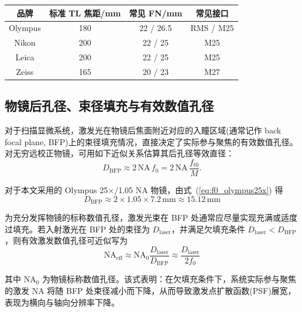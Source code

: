 \begin{table}[htbp]
\centering
{}
\label{tab:objective_brand_compare}
\setlength{\tabcolsep}{4pt}
\begin{tabular}{|c|c|c|c|}
\hline
品牌 & 标准 TL 焦距/mm & 常见 FN/mm & 常见接口 \\ \hline
Olympus & 180 & 22 / 26.5 & RMS / M25 \\ \hline
Nikon   & 200 & 22 / 25   & M25 \\ \hline
Leica   & 200 & 22 / 25   & M25 \\ \hline
Zeiss   & 165 & 20 / 23   & M27 \\ \hline
\end{tabular}
\end{table}




\subsection{物镜后孔径、束径填充与有效数值孔径}\label{2.4.2}

对于扫描显微系统，激发光在物镜后焦面附近对应的入瞳区域(通常记作 back focal plane, BFP)上的束径填充情况，直接决定了实际参与聚焦的有效数值孔径。对无穷远校正物镜，可用如下近似关系估算其后孔径等效直径：
\begin{equation}
  D_{\mathrm{BFP}}\approx 2\,\mathrm{NA}\,f_0
  =2\,\mathrm{NA}\,\frac{f_{t0}}{M}.
  \label{eq:Dbfp}
  \end{equation}

对于本文采用的 Olympus 25$\times$/1.05 NA 物镜，由式~(\ref{eq:f0_olympus25x}) 得
\begin{equation}
  D_{\mathrm{BFP}}\approx 2\times1.05\times7.2\,\mathrm{mm}\approx 15.12\,\mathrm{mm}
  \label{eq:Dbfp_olympus}
\end{equation}

为充分发挥物镜的标称数值孔径，激发光束在 BFP 处通常应尽量实现充满或适度过填充。若入射激光在 BFP 处的束径为 $D_{\mathrm{laser}}$，并满足欠填充条件 $D_{\mathrm{laser}}<D_{\mathrm{BFP}}$，则有效激发数值孔径可近似写为
\begin{equation}
  \mathrm{NA}_{\mathrm{eff}}\approx \mathrm{NA}_{0}\frac{D_{\mathrm{laser}}}{D_{\mathrm{BFP}}}
  \approx \frac{D_{\mathrm{laser}}}{2f_0}
  \label{eq:NAeff}
\end{equation}

其中 $\mathrm{NA}_{0}$ 为物镜标称数值孔径。该式表明：在欠填充条件下，系统实际参与聚焦的激发 NA 将随 BFP 处束径减小而下降，从而导致激发点扩散函数(PSF)展宽，表现为横向与轴向分辨率下降。

